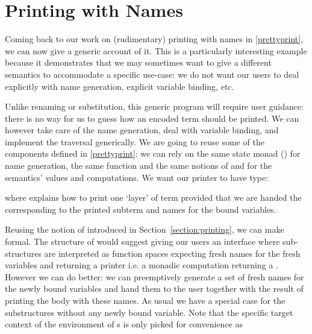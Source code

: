 \section{Printing with Names}\label{section:genericprinting}

Coming back to our work on (rudimentary) printing with names in
\cref{prettyprint}, we can now give a generic account of it. This is a
particularly interesting example because it demonstrates that we may
sometimes want to give  a different semantics to accommodate
a specific use-case: we do not want our users to deal explicitly with
name generation, explicit variable binding, etc.

Unlike renaming or substitution, this generic program will require user
guidance: there is no way for us to guess how an encoded term should be
printed. We can however take care of the name generation, deal with variable
binding, and implement the traversal generically. We are going to reuse
some of the components defined in \cref{prettyprint}: we can rely on the
same state monad () for name generation, the same 
function and the same notions of  and  for the
semantics' values and computations.
%
We want our printer to have type:
\begin{agdasnippet}
\end{agdasnippet}
%
where  explains how to print one `layer' of term provided that
we are handed the  corresponding to the printed subterm and
names for the bound variables.
%
\begin{agdasnippet}
\end{agdasnippet}
%
Reusing the notion of  introduced in Section~\ref{section:printing},
we can make  formal.
%
The structure of  would suggest giving our users an interface
where sub-structures are interpreted as  function spaces expecting
fresh names for the fresh variables and returning a printer i.e. a monadic
computation returning a . However we can do better: we can
preemptively generate a set of fresh names for the newly bound variables and
hand them to the user together with the result of printing the body with
these names. As usual we have a special case for the substructures without
any newly bound variable. Note that the specific target context of the
environment of s is only picked for convenience as 
